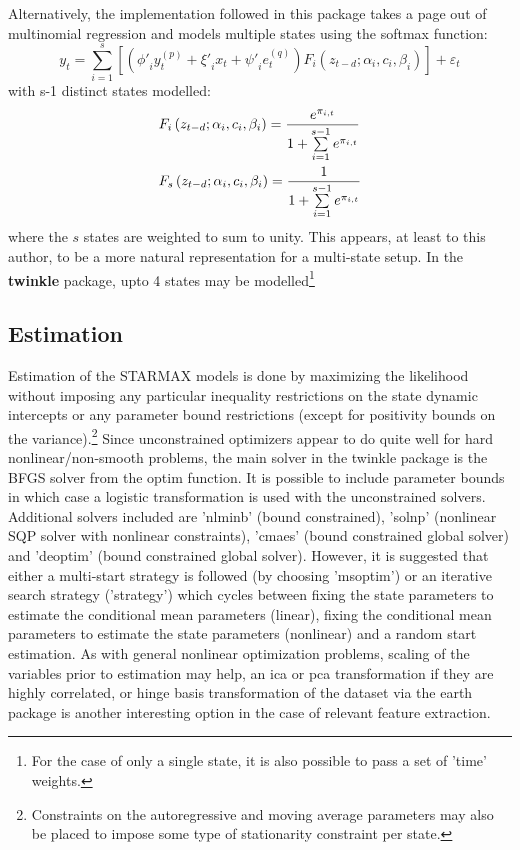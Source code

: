 Alternatively, the implementation followed in this package takes a page out of
multinomial regression and models multiple states using the softmax function:
\begin{equation}\label{eq:mrstar_new}
{y_t} = \sum\limits_{i = 1}^s {\left[ {\left( {{{\phi '}_i}y_t^{\left( p \right)} + {{\xi '}_i}{x_t} + {{\psi '}_i}e_t^{\left( q \right)}} \right){F_i}\left( {{z_{t-d}};{ \alpha _i},{ c_i},{\beta_i}} \right)} \right]}  + {\varepsilon _t}
\end{equation}
with s-1 distinct states modelled:
\begin{equation}
\begin{gathered}
  {F_i}\left( {{z_{t-d}};{ \alpha _i},{ c_i},{\beta_i}} \right) = \frac{{{e^{{\pi _{i,t}}}}}}
{{1 + \sum\limits_{i = 1}^{s - 1} {{e^{{\pi _{i,t}}}}} }} \hfill \\
  {F_s}\left( {{z_{t-d}};{ \alpha _i},{ c_i},{\beta_i}} \right) = \frac{1}
{{1 + \sum\limits_{i = 1}^{s - 1} {{e^{{\pi _{i,t}}}}} }} \hfill \\
\end{gathered}
\end{equation}
where the $s$ states are weighted to sum to unity. This appears, at least to
this author, to be a more natural representation for a multi-state setup. In the
\textbf{twinkle} package, upto 4 states may be modelled\footnote{For the case of
only a single state, it is also possible to pass a set of 'time' weights.}

\subsection{Estimation}
Estimation of the STARMAX models is done by maximizing the likelihood without
imposing any particular inequality restrictions on the state dynamic intercepts
or any parameter bound restrictions (except for positivity bounds on the
variance).\footnote{Constraints on the autoregressive and moving average
parameters may also be placed to impose some type of stationarity constraint
per state.} Since unconstrained optimizers appear to do quite well for hard
nonlinear/non-smooth problems, the main solver in the twinkle package is the
BFGS solver from the optim function. It is possible to include parameter bounds
in which case a logistic transformation is used with the unconstrained solvers.
Additional solvers included are 'nlminb' (bound constrained), 'solnp'
(nonlinear SQP solver with nonlinear constraints), 'cmaes' (bound constrained
global solver) and 'deoptim' (bound constrained global solver).
However, it is suggested that either a multi-start strategy is followed
(by choosing 'msoptim') or an iterative search strategy ('strategy') which
cycles between fixing the state parameters to estimate the conditional mean 
parameters (linear), fixing the conditional mean parameters to estimate the
state parameters (nonlinear) and a random start estimation. As with general
nonlinear optimization problems, scaling of the variables prior to estimation
may help, an ica or pca transformation if they are highly correlated, or hinge
basis transformation of the dataset via the earth package is another interesting
option in the case of relevant feature extraction.
